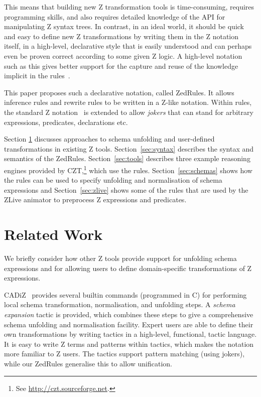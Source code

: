 \documentclass{entcs}
\begin{document}
This means that building new Z transformation tools is time-consuming,
requires programming skills, and also requires detailed knowledge of the
API for manipulating Z syntax trees.  In contrast, in an ideal world, it
should be quick and easy to define new Z transformations by writing them in
the Z notation itself, in a high-level, declarative style that is easily
understood and can perhaps even be proven correct according to some given Z
logic.  A high-level notation such as this gives better support for the
capture and reuse of the knowledge implicit in the
rules~\cite{armour:business-model00}.

This paper proposes such a declarative notation, called ZedRules.  It
allows inference rules and rewrite rules to be written in a Z-like
notation.  Within rules, the standard Z notation~\cite{ISOZ} is extended to
allow \emph{jokers} that can stand for arbitrary expressions, predicates,
declarations etc.

Section \ref{sec:relwork} discusses approaches to schema unfolding and
user-defined transformations in existing Z tools.  Section~\ref{sec:syntax}
describes the syntax and semantics of the ZedRules.
Section~\ref{sec:tools} describes three example reasoning engines provided
by CZT,\footnote{See \url{http://czt.sourceforge.net}.} which use the rules.
Section~\ref{sec:schemas} shows how the rules can be used to specify
unfolding and normalisation of schema expressions and
Section~\ref{sec:zlive} shows some of the rules that are used by the ZLive
animator to preprocess Z expressions and predicates.


\section{Related Work} \label{sec:relwork}

We briefly consider how other Z tools provide support for unfolding
schema expressions and for allowing users to define domain-specific
transformations of Z expressions.

CADiZ~\cite{cadiz:refman02} provides several builtin commands (programmed
in C) for performing local schema transformation, normalisation, and
unfolding steps.  A \emph{schema expansion} tactic is provided, which
combines these steps to give a comprehensive schema unfolding and
normalisation facility.  Expert users are able to define their own
transformations by writing tactics in a high-level, functional, tactic
language.  It is easy to write Z terms and patterns within tactics, which
makes the notation more familiar to Z users.  The tactics support pattern
matching (using jokers), while our ZedRules generalise this to allow
unification.
\end{document}
